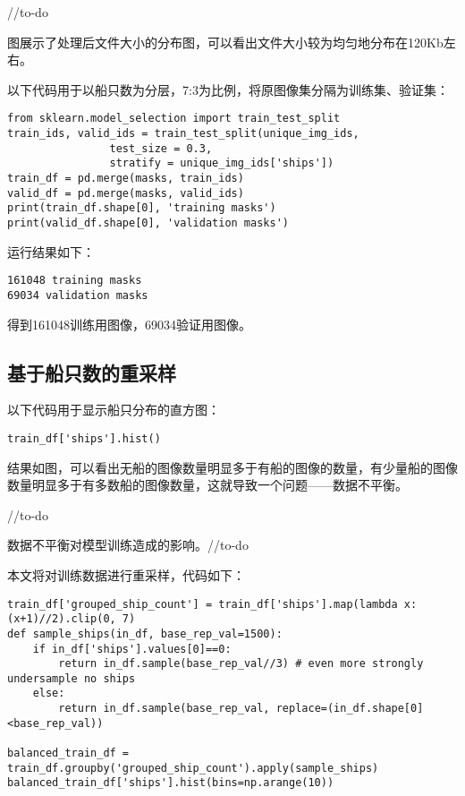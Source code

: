 //to-do

图展示了处理后文件大小的分布图，可以看出文件大小较为均匀地分布在120Kb左右。

以下代码用于以船只数为分层，7:3为比例，将原图像集分隔为训练集、验证集：

\begin{verbatim}
from sklearn.model_selection import train_test_split
train_ids, valid_ids = train_test_split(unique_img_ids, 
                test_size = 0.3, 
                stratify = unique_img_ids['ships'])
train_df = pd.merge(masks, train_ids)
valid_df = pd.merge(masks, valid_ids)
print(train_df.shape[0], 'training masks')
print(valid_df.shape[0], 'validation masks')
\end{verbatim}

运行结果如下：

\begin{verbatim}
161048 training masks
69034 validation masks
\end{verbatim}

得到161048训练用图像，69034验证用图像。

\subsection{基于船只数的重采样}

以下代码用于显示船只分布的直方图：

\begin{verbatim}
train_df['ships'].hist()
\end{verbatim}

结果如图，可以看出无船的图像数量明显多于有船的图像的数量，有少量船的图像数量明显多于有多数船的图像数量，这就导致一个问题------数据不平衡。

//to-do

数据不平衡对模型训练造成的影响。//to-do

本文将对训练数据进行重采样，代码如下：

\begin{verbatim}
train_df['grouped_ship_count'] = train_df['ships'].map(lambda x: (x+1)//2).clip(0, 7)
def sample_ships(in_df, base_rep_val=1500):
    if in_df['ships'].values[0]==0:
        return in_df.sample(base_rep_val//3) # even more strongly undersample no ships
    else:
        return in_df.sample(base_rep_val, replace=(in_df.shape[0]<base_rep_val))
    
balanced_train_df = train_df.groupby('grouped_ship_count').apply(sample_ships)
balanced_train_df['ships'].hist(bins=np.arange(10))
\end{verbatim}

